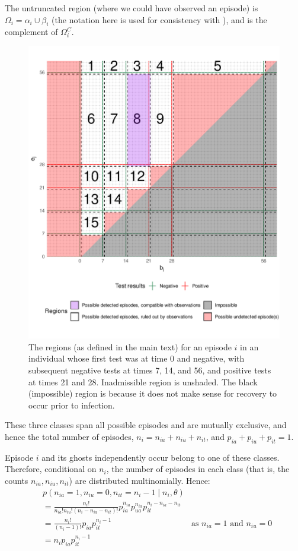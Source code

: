 \documentclass[thesis.tex]{subfiles}
\begin{document}
The untruncated region (where we could have observed an episode) is
$\Omega_i = \alpha_i \cup \beta_i$ (the notation here is used for
consistency with \textcite{heiseyModelling}), and is the
complement of $\Omega^C_i$.

\begin{figure}
\includegraphics[width=\textwidth]{cis-perfect-testing/regions_diag}
\caption[Admissible, inadmissible, and untruncated infections]{The regions (as defined in the main text) for an episode $i$ in an
individual whose first test was at time 0 and negative, with subsequent
negative tests at times 7, 14, and 56, and positive tests at times 21
and 28. Inadmissible region is unshaded. The black (impossible) region is because it does not make sense for recovery to occur prior to infection. \label{perf-test:fig:partitionSpace}}
\end{figure}

These three classes span all possible episodes and are mutually
exclusive, and hence the total number of episodes,
$n_i = n_{ia} + n_{iu} + n_{it}$, and
$p_{ia} + p_{iu} + p_{it} = 1$.

Episode $i$ and its ghosts independently occur belong to one of these
classes. Therefore, conditional on $n_i$, the number of episodes in
each class (that is, the counts $n_{ia}, n_{iu}, n_{it}$) are
distributed multinomially. Hence:
\begin{align}
&p(n_{ia} = 1, n_{iu} = 0, n_{it} = n_i - 1 \mid n_i, \theta) \\
&= \frac{n_i!}{n_{ia}! n_{iu}! (n_i- n_{ia} - n_{it})!} p_{ia}^{n_{ia}} p_{ua}^{n_{ia}} p_{it}^{n_i- n_{ia} - n_{it}} \\
&= \frac{n_i!}{(n_i-1)!} p_{ia} p_{it}^{n_i- 1} &\text{as $n_{ia} = 1$ and $n_{iu} = 0$}\\
&= n_i p_{ia} p_{it}^{n_i- 1}
\end{align}
\end{document}
